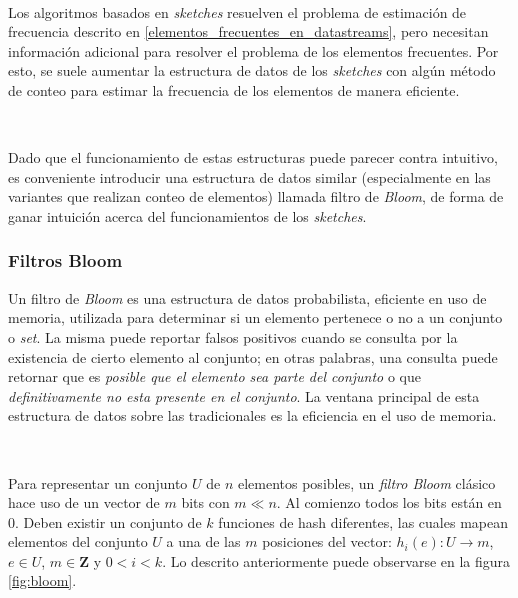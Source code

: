 \documentclass[a4paper,12pt, oneside]{article}
\begin{document}
\

Los algoritmos basados en \textit{sketches} resuelven el problema de estimación de frecuencia descrito en \ref{elementos_frecuentes_en_datastreams}, pero necesitan información adicional para resolver el problema de los elementos frecuentes. Por esto, se suele aumentar la estructura de datos de los \textit{sketches} con algún método de conteo para estimar la frecuencia de los elementos de manera eficiente.

\

Dado que el funcionamiento de estas estructuras puede parecer contra intuitivo, es conveniente introducir una estructura de datos similar (especialmente en las variantes que realizan conteo de elementos) llamada filtro de \textit{Bloom}, de forma de ganar intuición acerca del funcionamientos de los \textit{sketches}.

\subsubsection{Filtros Bloom}

Un filtro de \textit{Bloom} es una estructura de datos probabilista, eficiente en uso de memoria, utilizada para determinar si un elemento pertenece o no a un conjunto o \textit{set}. La misma puede reportar falsos positivos cuando se consulta por la existencia de cierto elemento al conjunto\cite{Putze:2010:CHS:1498698.1594230}; en otras palabras, una consulta puede retornar que es \textit{posible que el elemento sea parte del conjunto} o que \textit{definitivamente no esta presente en el conjunto}. La ventana principal de esta estructura de datos sobre las tradicionales es la eficiencia en el uso de memoria.

\

Para representar un conjunto $U$ de $n$ elementos posibles, un \textit{filtro Bloom} clásico hace uso de un vector de $m$ bits con $m \ll n$. Al comienzo todos los bits están en $0$. Deben existir un conjunto de $k$ funciones de hash diferentes, las cuales mapean elementos del conjunto $U$ a una de las $m$ posiciones del vector: $h_i(e): U \rightarrow m$, $e \in U$, $m \in \mathbf{Z}$ y $0 < i < k$. Lo descrito anteriormente puede observarse en la figura \ref{fig:bloom}.
\end{document}
